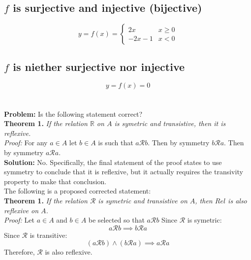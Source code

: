 \documentclass[]{article}
\newcommand{\Rel}{\mathcal{R}}
\newcommand{\R}{\mathbb{R}}
\begin{document}
\subsection{$f$ is surjective and injective (bijective)}

\begin{displaymath}
	y = f(x) =
	\begin{cases}
		2 x & x \geq 0\\
		-2 x - 1 & x < 0
	\end{cases}
\end{displaymath}

\subsection{$f$ is niether surjective nor injective}

\begin{displaymath}
	y = f(x) = 0
\end{displaymath}


\newpage
\section{}
\textbf{Problem:}
Is the following statement correct?\\

\textbf{Theorem 1.}
\textit{If the relation $\R$ on $A$ is symetric and transistive, then it is reflexive.}\\
\textit{Proof:}
For any $a \in A$ let $b \in A$ is such that $a \Rel b$. Then by symmetry $b \Rel a$. 
Then by symmetry $a \Rel a$.\\

\textbf{Solution:}
No. Specifically, the final statement of the proof states to use symmetry to conclude that 
it is reflexive, but it actually requires the transivity property to make that conclusion.\\

The following is a proposed corrected statement:\\

\textbf{Theorem 1.}
\textit{If the relation $\Rel$ is symetric and transistive on $A$, then $Rel$ is also reflexive on $A$.}\\
\textit{Proof:}
Let $a \in A$ and $b \in A$ be selected so that $a \Rel b$
Since $\Rel$ is symetric: $$a \Rel b \implies b \Rel a$$
Since $\Rel$ is transitive: $$(a \Rel b) \land (b \Rel a) \implies a \Rel a$$
Therefore, $\Rel$ is also reflexive.
\end{document}
